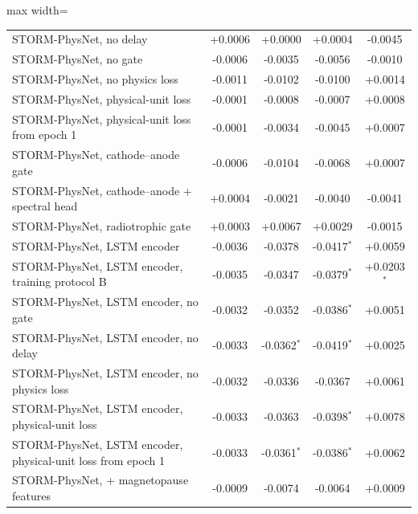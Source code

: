 \begin{table}[!t]
\begin{adjustbox}{max width=\linewidth}
\begin{tabular}{lcccc}
STORM-PhysNet, no delay & +0.0006 & +0.0000 & +0.0004 & -0.0045 \\
STORM-PhysNet, no gate & -0.0006 & -0.0035 & -0.0056 & -0.0010 \\
STORM-PhysNet, no physics loss & -0.0011 & -0.0102 & -0.0100 & +0.0014 \\
STORM-PhysNet, physical-unit loss & -0.0001 & -0.0008 & -0.0007 & +0.0008 \\
STORM-PhysNet, physical-unit loss from epoch 1 & -0.0001 & -0.0034 & -0.0045 & +0.0007 \\
STORM-PhysNet, cathode--anode gate & -0.0006 & -0.0104 & -0.0068 & +0.0007 \\
STORM-PhysNet, cathode--anode + spectral head & +0.0004 & -0.0021 & -0.0040 & -0.0041 \\
STORM-PhysNet, radiotrophic gate & +0.0003 & +0.0067 & +0.0029 & -0.0015 \\
STORM-PhysNet, LSTM encoder & -0.0036 & -0.0378 & -0.0417$^{*}$ & +0.0059 \\
STORM-PhysNet, LSTM encoder, training protocol B & -0.0035 & -0.0347 & -0.0379$^{*}$ & +0.0203$^{*}$ \\
STORM-PhysNet, LSTM encoder, no gate & -0.0032 & -0.0352 & -0.0386$^{*}$ & +0.0051 \\
STORM-PhysNet, LSTM encoder, no delay & -0.0033 & -0.0362$^{*}$ & -0.0419$^{*}$ & +0.0025 \\
STORM-PhysNet, LSTM encoder, no physics loss & -0.0032 & -0.0336 & -0.0367 & +0.0061 \\
STORM-PhysNet, LSTM encoder, physical-unit loss & -0.0033 & -0.0363 & -0.0398$^{*}$ & +0.0078 \\
STORM-PhysNet, LSTM encoder, physical-unit loss from epoch 1 & -0.0033 & -0.0361$^{*}$ & -0.0386$^{*}$ & +0.0062 \\
STORM-PhysNet, + magnetopause features & -0.0009 & -0.0074 & -0.0064 & +0.0009 \\
\bottomrule
\end{tabular}
\end{adjustbox}

\par{}
\end{table}
